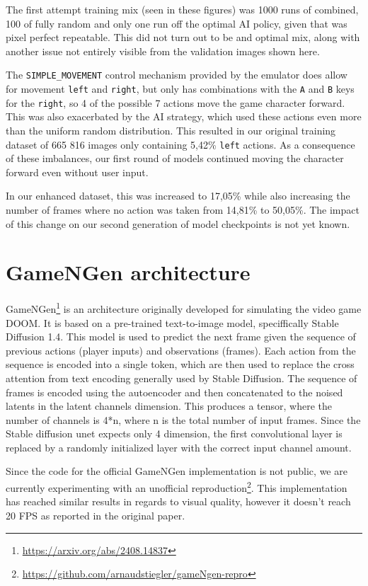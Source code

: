 \documentclass[twocolumn,a4paper]{article}
\begin{document}
The first attempt training mix (seen in these figures) was 1000 runs of combined, 100 of fully random and only one run off the optimal AI policy, given that was pixel perfect repeatable. This did not turn out to be and optimal mix, along with another issue not entirely visible from the validation images shown here.

The \texttt{SIMPLE\_MOVEMENT} control mechanism provided by the emulator does allow for movement \texttt{left} and \texttt{right}, but only has combinations with the \texttt{A} and \texttt{B} keys for the \texttt{right}, so 4 of the possible 7 actions move the game character forward. This was also exacerbated by the AI strategy, which used these actions even more than the uniform random distribution. This resulted in our original training dataset of 665 816 images only containing 5,42\% \texttt{left} actions. As a consequence of these imbalances, our first round of models continued moving the character forward even without user input.

In our enhanced dataset, this was increased to 17,05\% while also increasing the number of frames where no action was taken from 14,81\% to 50,05\%. The impact of this change on our second generation of model checkpoints is not yet known.

\section{GameNGen architecture}
\label{gamengen}

GameNGen\footnote{\url{https://arxiv.org/abs/2408.14837}} is an architecture originally developed for simulating the video game DOOM. It is based on a pre-trained text-to-image model, speciffically Stable Diffusion 1.4. This model is used to predict the next frame given the sequence of previous actions (player inputs) and observations (frames). Each action from the sequence is encoded into a single token, which are then used to replace the cross attention from text encoding generally used by Stable Diffusion. The sequence of frames is encoded using the autoencoder and then concatenated to the noised latents in the latent channels dimension. This produces a tensor, where the number of channels is 4*n, where n is the total number of input frames. Since the Stable diffusion unet expects only 4 dimension, the first convolutional layer is replaced by a randomly initialized layer with the correct input channel amount.

Since the code for the official GameNGen implementation is not public, we are currently experimenting with an unofficial reproduction\footnote{\url{https://github.com/arnaudstiegler/gameNgen-repro}}. This implementation has reached similar results in regards to visual quality, however it doesn't reach 20 FPS as reported in the original paper.
\end{document}
